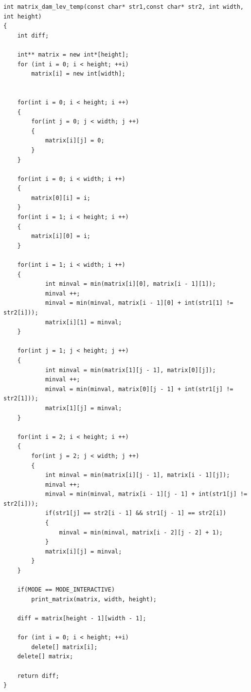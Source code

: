\begin{lstlisting}[caption=Матричный алгоритм поиска расстояния Дамерау~---~Левенштейна]
int matrix_dam_lev_temp(const char* str1,const char* str2, int width, int height)
{
    int diff;

    int** matrix = new int*[height];
    for (int i = 0; i < height; ++i)
        matrix[i] = new int[width];


    for(int i = 0; i < height; i ++)
    {
        for(int j = 0; j < width; j ++)
        {
            matrix[i][j] = 0;  
        }
    }  

    for(int i = 0; i < width; i ++)
    {
        matrix[0][i] = i;
    }
    for(int i = 1; i < height; i ++)
    {
        matrix[i][0] = i;
    }

    for(int i = 1; i < width; i ++)
    {
            int minval = min(matrix[i][0], matrix[i - 1][1]);
            minval ++;
            minval = min(minval, matrix[i - 1][0] + int(str1[1] != str2[i]));
            matrix[i][1] = minval;
    }

    for(int j = 1; j < height; j ++)
    {
            int minval = min(matrix[1][j - 1], matrix[0][j]);
            minval ++;
            minval = min(minval, matrix[0][j - 1] + int(str1[j] != str2[1]));
            matrix[1][j] = minval;
    }

    for(int i = 2; i < height; i ++)
    {
        for(int j = 2; j < width; j ++)
        {
            int minval = min(matrix[i][j - 1], matrix[i - 1][j]);
            minval ++;
            minval = min(minval, matrix[i - 1][j - 1] + int(str1[j] != str2[i]));
            if(str1[j] == str2[i - 1] && str1[j - 1] == str2[i])
            {
                minval = min(minval, matrix[i - 2][j - 2] + 1);
            }
            matrix[i][j] = minval;  
        }
    }  

    if(MODE == MODE_INTERACTIVE)
        print_matrix(matrix, width, height);  

    diff = matrix[height - 1][width - 1];

    for (int i = 0; i < height; ++i)
        delete[] matrix[i];    
    delete[] matrix;

    return diff;
}
\end{lstlisting}
\clearpage

